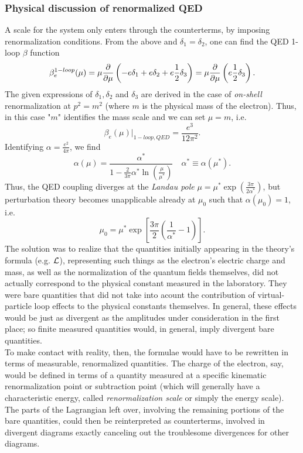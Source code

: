 \subsubsection{Physical discussion of renormalized QED}
A scale for the system only enters through the counterterms, by imposing renormalization conditions. From the above and $\delta_1=\delta_2$, one can find the QED 1-loop $\beta$ function
\begin{equation}
	\beta^{1-loop}_e(\mu)= \mu \frac{\partial}{\partial \mu} \left(-e \delta_1+e\delta_2 + e \frac{1}{2} \delta_3\right)= \mu \frac{\partial}{\partial \mu} \left(e \frac{1}{2} \delta_3\right).
\end{equation}
The given expressions of $\delta_1,\delta_2$ and $\delta_3$ are derived in the case of \emph{on-shell} renormalization at $p^2=m^2$ (where $m$ is the physical mass of the electron). Thus, in this case "$m$" identifies the mass scale and we can set $\mu=m$, i.e.
\begin{equation}
	\beta_e(\mu) |_{1-loop, QED} = \frac{e^3}{12 \pi^2}.
\end{equation}
Identifying $\alpha =\frac{e^2}{4 \pi}$, we find
\begin{equation}
	\alpha(\mu) = \frac{\alpha^*}{1-\frac{2}{3 \pi} \alpha^* \ln(\frac{\mu}{\mu^*}) }\quad \alpha^* \equiv \alpha(\mu^*).
\end{equation}
Thus, the QED coupling diverges at the \emph{Landau pole} $\mu = \mu^* \exp(\frac{3\pi}{2 \alpha^*})$, but perturbation theory becomes unapplicable already at $\mu_0$ such that $\alpha(\mu_0)=1$, i.e. 
\begin{equation*}
	\mu_0 = \mu^* \exp \left[\frac{3\pi}{2} \left(\frac{1}{\alpha^*} -1\right)\right].
\end{equation*}
The solution was to realize that the quantities initially appearing in the theory's formula (e.g. $\mathcal{L}$), representing such things as the electron's electric charge and mass, as well as the normalization of the quantum fields themselves, did not actually correspond to the physical constant measured in the laboratory. They were bare quantities that did not take into acount the contribution of virtual-particle loop effects to the physical constants themselves. In general, these effects would be just as divergent as the amplitudes under consideration in the first place; so finite measured quantities would, in general, imply divergent bare quantities.\\
To make contact with reality, then, the formulae would have to be rewritten in terms of measurable, renormalized quantities. The charge of the electron, say, would be defined in terms of a quantity measured at a specific kinematic renormalization point or subtraction point (which will generally have a characteristic energy, called \emph{renormalization scale} or simply the energy scale). The parts of the Lagrangian left over, involving the remaining portions of the bare quantities, could then be reinterpreted as counterterms, involved in divergent diagrams exactly canceling out the troublesome divergences for other diagrams.\\
